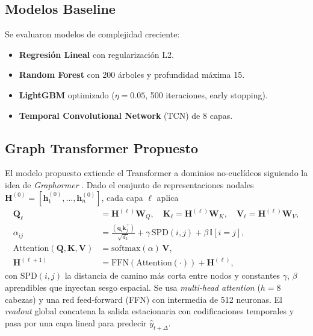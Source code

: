 \documentclass[conference]{IEEEtran}
\begin{document}
\subsection{Modelos Baseline}
Se evaluaron modelos de complejidad creciente:
\begin{itemize}
  \item \textbf{Regresión Lineal} con regularización L2.
  \item \textbf{Random Forest} con 200 árboles y profundidad máxima 15.
  \item \textbf{LightGBM} \cite{ke2017lightgbm} optimizado ($\eta=0.05$, 500 iteraciones, early stopping).
  \item \textbf{Temporal Convolutional Network} (TCN) de 8 capas.
\end{itemize}

\subsection{Graph Transformer Propuesto}
El modelo propuesto extiende el Transformer a dominios no‐euclídeos siguiendo
la idea de \emph{Graphormer} \cite{ying2021graphormer}. Dado el conjunto de
representaciones nodales $\mathbf{H}^{(0)}\!=\![\mathbf{h}_1^{(0)},\ldots,\mathbf{h}_n^{(0)}]$,
cada capa $\ell$ aplica
\begin{align}
  \mathbf{Q}_\ell &= \mathbf{H}^{(\ell)} \mathbf{W}_Q,\quad
  \mathbf{K}_\ell = \mathbf{H}^{(\ell)} \mathbf{W}_K,\quad
  \mathbf{V}_\ell = \mathbf{H}^{(\ell)} \mathbf{W}_V,\\
  \alpha_{ij} &= \frac{(\mathbf{q}_i\mathbf{k}_j^{\top})}{\sqrt{d_k}} + \gamma\,\mathrm{SPD}(i,j) + \beta\,\mathbb{I}[i=j],\\
  \mathrm{Attention}(\mathbf{Q},\mathbf{K},\mathbf{V}) &= \mathrm{softmax}(\alpha)\,\mathbf{V},\\
  \mathbf{H}^{(\ell+1)} &= \mathrm{FFN}(\mathrm{Attention}(\cdot))+\mathbf{H}^{(\ell)},
\end{align}
con $\mathrm{SPD}(i,j)$ la distancia de camino más corta entre nodos y
constantes $\gamma$, $\beta$ aprendibles que inyectan sesgo espacial. Se usa
\emph{multi‐head attention} ($h=8$ cabezas) y una red feed‐forward (FFN) con
intermedia de 512 neuronas. El \emph{readout} global concatena la salida
estacionaria con codificaciones temporales y pasa por una capa lineal para
predecir $\hat{y}_{t+\Delta}$.
\end{document}
